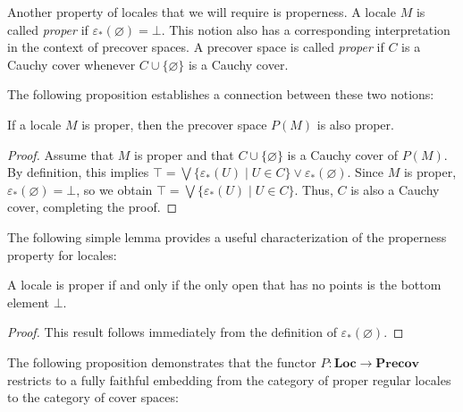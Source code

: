 \documentclass[pdflatex,sn-mathphys-num]{sn-jnl}
\theoremstyle{definition}
\theoremstyle{remark}
\numberwithin{figure}{section}
\newcommand{\cat}[1]{\mathbf{#1}}
\begin{document}
Another property of locales that we will require is properness.
A locale $M$ is called \emph{proper} if $\varepsilon_*(\varnothing) = \bot$.
This notion also has a corresponding interpretation in the context of precover spaces.
A precover space is called \emph{proper} if $C$ is a Cauchy cover whenever $C \cup \{ \varnothing \}$ is a Cauchy cover.

The following proposition establishes a connection between these two notions:

\begin{prop}
If a locale $M$ is proper, then the precover space $P(M)$ is also proper.
\end{prop}
\begin{proof}
Assume that $M$ is proper and that $C \cup \{ \varnothing \}$ is a Cauchy cover of $P(M)$.
By definition, this implies $\top = \bigvee \{ \varepsilon_*(U) \mid U \in C \} \vee \varepsilon_*(\varnothing)$.
Since $M$ is proper, $\varepsilon_*(\varnothing) = \bot$, so we obtain $\top = \bigvee \{ \varepsilon_*(U) \mid U \in C \}$.
Thus, $C$ is also a Cauchy cover, completing the proof.
\end{proof}

The following simple lemma provides a useful characterization of the properness property for locales:

\begin{lem}
A locale is proper if and only if the only open that has no points is the bottom element $\bot$.
\end{lem}
\begin{proof}
This result follows immediately from the definition of $\varepsilon_*(\varnothing)$.
\end{proof}

The following proposition demonstrates that the functor $P : \cat{Loc} \to \cat{Precov}$ restricts to a fully faithful embedding from the category of proper regular locales to the category of cover spaces:
\end{document}
